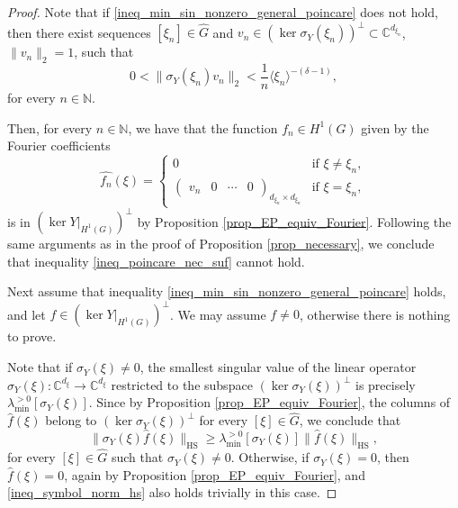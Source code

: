 \documentclass[11pt]{amsart}
\numberwithin{theorem}{section}
\numberwithin{equation}{section}
\theoremstyle{definition}
\numberwithin{example}{section}
\theoremstyle{definition}
\theoremstyle{definition}
\newcommand{\N}{\mathbb{N}}
\newcommand{\C}{\mathbb{C}}
\newcommand{\HS}{\operatorname{HS}}
\begin{document}
\begin{proof}
Note that if \eqref{ineq_min_sin_nonzero_general_poincare} does not hold, then there exist sequences $[\xi_n]\in\widehat{G}$ and $v_{n}\in (\ker \sigma_Y(\xi_n))^\perp\subset \C^{d_{\xi_n}}$, $\|v_n\|_2=1$, such that 
\begin{equation*}
  0< \| \sigma_Y(\xi_n)v_n\|_2<\frac{1}{n}\langle \xi_n \rangle ^{-(\delta-1)},
\end{equation*}
for every $n\in\N$. 


Then, for every $n\in\N$, we have that the function $f_n\in H^1(G)$ given by the Fourier coefficients 
\begin{equation*}
    \widehat{f_n}(\xi)=\begin{cases}
        0&\text{if }\xi\neq \xi_n,\\
         \begin{pmatrix}
        v_n&0&\cdots&0
    \end{pmatrix}_{d_{\xi_n}\times d_{\xi_n}}&\text{if }\xi=\xi_n,
    \end{cases}
\end{equation*}
is in $(\ker Y|_{H^1(G)})^\perp$ by Proposition \ref{prop_EP_equiv_Fourier}. Following the same arguments as in the proof of Proposition \ref{prop_necessary}, we conclude that inequality \eqref{ineq_poincare_nec_suf} cannot hold.

Next assume that inequality \eqref{ineq_min_sin_nonzero_general_poincare} holds, and let $f\in (\ker Y|_{H^1(G)})^\perp$. We may assume $f\neq 0$, otherwise there is nothing to prove.


Note that if $\sigma_Y(\xi)\neq 0$, the smallest singular value of the linear operator $\sigma_Y(\xi):\C^{d_\xi}\to \C^{d_\xi}$ restricted to the subspace $(\ker \sigma_Y(\xi))^\perp$ is precisely $\lambda_{\min}^{>0}[\sigma_Y(\xi)]$. 
Since by Proposition \ref{prop_EP_equiv_Fourier}, the columns of $\widehat{f}(\xi)$ belong to $(\ker \sigma_Y(\xi))^\perp$ for every $[\xi]\in\widehat{G}$,  we conclude that 
\begin{equation}\label{ineq_symbol_norm_hs}
    \|\sigma_Y(\xi)\widehat{f}(\xi)\|_{\HS}\geq \lambda_{\min}^{>0}[\sigma_Y(\xi)]\|\widehat{f}(\xi)\|_{\HS},
\end{equation}
for every $[\xi]\in\widehat{G}$ such that $\sigma_Y(\xi)\neq 0$. Otherwise, if $\sigma_Y(\xi)=0$, then $\widehat{f}(\xi)=0$, again by Proposition \ref{prop_EP_equiv_Fourier},   and \eqref{ineq_symbol_norm_hs} also holds trivially in this case.



\end{proof}
\end{document}
